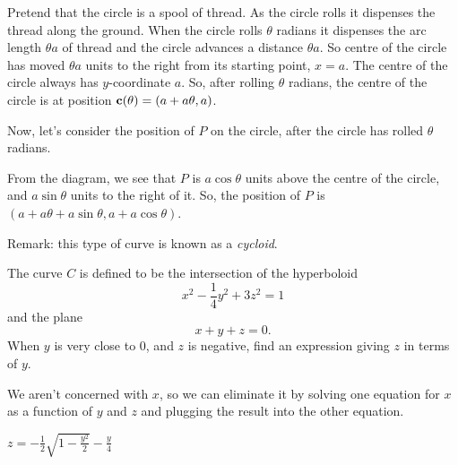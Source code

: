 \begin{solution}
Pretend that the circle is a spool of thread. As the 
           circle rolls it dispenses the thread along the ground.
           When the circle rolls $\theta$ radians it dispenses the
           arc length $\theta a$ of thread and the circle advances
           a distance $\theta a$. So centre of the circle has 
           moved $\theta a$ units to the right from its starting point, $x=a$. The centre of the circle always has $y$-coordinate $a$. So, after rolling $\theta$ radians, the centre of the circle is at position $\mathbf{c}(\theta)=(a+a\theta,a)$.

Now, let's consider the position of $P$ on the circle, after the circle has rolled $\theta$ radians. 

\begin{center}
\end{center}
From the diagram, we see that $P$ is $a\cos \theta$ units above the centre of the circle, and $a\sin \theta$ units to the right of it. So, the position of $P$ is $(a+a\theta+a\sin\theta,a+a\cos\theta)$.

Remark: this type of curve is known as a \emph{cycloid}.
\end{solution}
\begin{question}\label{prob_s1.0last}
The curve $C$ is defined to be the intersection of the hyperboloid
\[x^2-\frac{1}{4}y^2+3z^2=1\]
and the plane
\[x+y+z=0.\]
When $y$ is very close to 0, and $z$ is negative, find an expression giving $z$ in terms of $y$.
\end{question}
\begin{hint}
We aren't concerned with $x$, so we can eliminate it by solving one equation for $x$ as a function
        of $y$ and $z$ and plugging the result into the other equation.
        \end{hint}
\begin{answer}
$z=-\frac12\sqrt{1-\frac{y^2}{2}}-\frac{y}{4}$
\end{answer}
